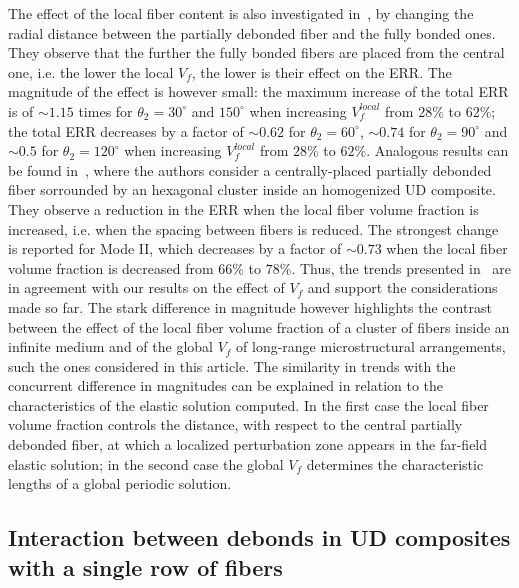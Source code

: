 \documentclass[review]{elsarticle}
\begin{document}
The effect of the local fiber content is also investigated in~\cite{Sandino2016}, by changing the radial distance between the partially debonded fiber and the fully bonded ones. They observe that the further the fully bonded fibers are placed from the central one, i.e. the lower the local $V_{f}$, the lower is their effect on the ERR. The magnitude of the effect is however small: the maximum increase of the total ERR is of $\sim1.15$ times for $\theta_{2}=30^{\circ}$ and $150^{\circ}$ when increasing $V_{f}^{local}$ from $28\%$ to $62\%$; the total ERR decreases by a factor of $\sim0.62$ for $\theta_{2}=60^{\circ}$, $\sim0.74$ for $\theta_{2}=90^{\circ}$ and $\sim0.5$ for $\theta_{2}=120^{\circ}$ when increasing $V_{f}^{local}$ from $28\%$ to $62\%$. Analogous results can be found in~\cite{Zhuang2018}, where the authors consider a centrally-placed partially debonded fiber sorrounded by an hexagonal cluster inside an homogenized UD composite. They observe a reduction in the ERR when the local fiber volume fraction is increased, i.e. when the spacing between fibers is reduced. The strongest change is reported for Mode II, which decreases by a factor of $\sim0.73$ when the local fiber volume fraction is decreased from $66\%$ to $78\%$. Thus, the trends presented in~\cite{Sandino2016,Zhuang2018} are in agreement with our results on the effect of $V_{f}$ and support the considerations made so far. The stark difference in magnitude however highlights the contrast between the effect of the local fiber volume fraction of a cluster of fibers inside an infinite medium and of the global $V_{f}$ of long-range microstructural arrangements, such the ones considered in this article. The similarity in trends with the concurrent difference in magnitudes can be explained in relation to the characteristics of the elastic solution computed. In the first case the local fiber volume fraction controls the distance, with respect to the central partially debonded fiber, at which a localized perturbation zone appears in the far-field elastic solution; in the second case the global $V_{f}$ determines the characteristic lengths of a global periodic solution.

\subsection{Interaction between debonds in UD composites with a single row of fibers}\label{subsec:singlefiberud}
\end{document}
